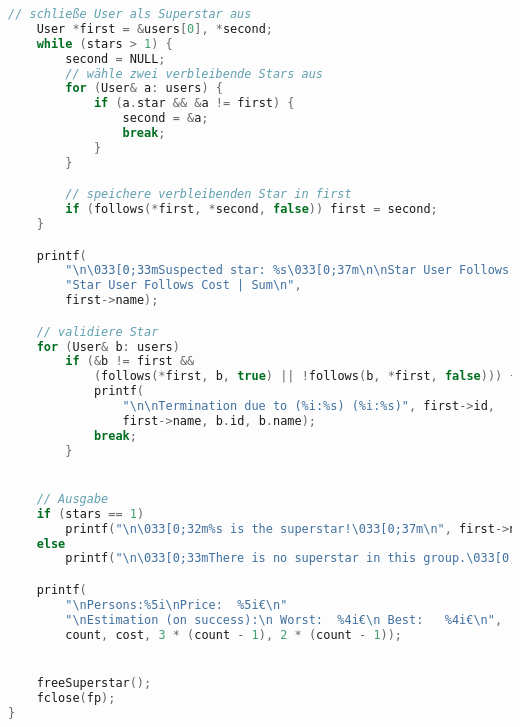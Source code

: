 \documentclass[a4paper,10pt,ngerman]{scrartcl}
\begin{document}
\begin{lstlisting}[language=C++]
    // schließe User als Superstar aus
    User *first = &users[0], *second;
    while (stars > 1) {
        second = NULL;
        // wähle zwei verbleibende Stars aus
        for (User& a: users) {
            if (a.star && &a != first) {
                second = &a;
                break;
            }
        }

        // speichere verbleibenden Star in first
        if (follows(*first, *second, false)) first = second;
    }

    printf(
        "\n\033[0;33mSuspected star: %s\033[0;37m\n\nStar User Follows Cost | "
        "Star User Follows Cost | Sum\n",
        first->name);

    // validiere Star
    for (User& b: users)
        if (&b != first &&
            (follows(*first, b, true) || !follows(b, *first, false))) {
            printf(
                "\n\nTermination due to (%i:%s) (%i:%s)", first->id,
                first->name, b.id, b.name);
            break;
        }


    // Ausgabe
    if (stars == 1)
        printf("\n\033[0;32m%s is the superstar!\033[0;37m\n", first->name);
    else
        printf("\n\033[0;33mThere is no superstar in this group.\033[0;37m\n");

    printf(
        "\nPersons:%5i\nPrice:  %5i€\n"
        "\nEstimation (on success):\n Worst:  %4i€\n Best:   %4i€\n",
        count, cost, 3 * (count - 1), 2 * (count - 1));


    freeSuperstar();
    fclose(fp);
}
\end{lstlisting}
\end{document}
